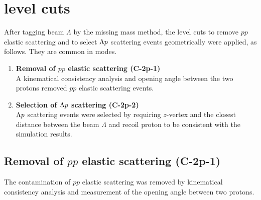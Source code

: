 \clearpage
\section{ level cuts}
\label{sec-Lp_common}

After tagging beam $\Lambda$ by the missing mass method, the  level cuts to remove $pp$ elastic scattering and to select $\Lambda p$ scattering events geometrically were applied, as follows. They are common in  modes.
\begin{enumerate}
  \item {\bf Removal of $pp$ elastic scattering ({\bf C-2p-1}) } \\
  A kinematical consistency analysis and opening angle between the two protons removed $pp$ elastic scattering events. 
  \item {\bf Selection of $\Lambda p$ scattering ({\bf C-2p-2}) } \\
  $\Lambda p$ scattering events were selected by requiring $z$-vertex and the closest distance between the beam $\Lambda$ and recoil proton to be consistent with the simulation results.
\end{enumerate}



\subsection{Removal of $pp$ elastic scattering ({\bf C-2p-1})}
\label{sec-ppRemoval}

The contamination of $pp$ elastic scattering was removed by kinematical consistency analysis and measurement of the opening angle between two protons.

